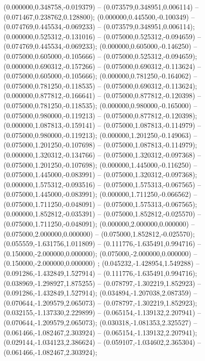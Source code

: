  (0.000000,0.348758,-0.019379) -- (0.073579,0.348951,0.006114) -- (0.071467,0.238762,0.128800);
 (0.000000,0.445500,-0.100349) -- (0.074769,0.445534,-0.069233) -- (0.073579,0.348951,0.006114);
 (0.000000,0.525312,-0.131016) -- (0.075000,0.525312,-0.094659) -- (0.074769,0.445534,-0.069233);
 (0.000000,0.605000,-0.146250) -- (0.075000,0.605000,-0.105666) -- (0.075000,0.525312,-0.094659);
 (0.000000,0.690312,-0.157266) -- (0.075000,0.690312,-0.113624) -- (0.075000,0.605000,-0.105666);
 (0.000000,0.781250,-0.164062) -- (0.075000,0.781250,-0.118535) -- (0.075000,0.690312,-0.113624);
 (0.000000,0.877812,-0.166641) -- (0.075000,0.877812,-0.120398) -- (0.075000,0.781250,-0.118535);
 (0.000000,0.980000,-0.165000) -- (0.075000,0.980000,-0.119213) -- (0.075000,0.877812,-0.120398);
 (0.000000,1.087813,-0.159141) -- (0.075000,1.087813,-0.114979) -- (0.075000,0.980000,-0.119213);
 (0.000000,1.201250,-0.149063) -- (0.075000,1.201250,-0.107698) -- (0.075000,1.087813,-0.114979);
 (0.000000,1.320312,-0.134766) -- (0.075000,1.320312,-0.097368) -- (0.075000,1.201250,-0.107698);
 (0.000000,1.445000,-0.116250) -- (0.075000,1.445000,-0.083991) -- (0.075000,1.320312,-0.097368);
 (0.000000,1.575312,-0.093516) -- (0.075000,1.575313,-0.067565) -- (0.075000,1.445000,-0.083991);
 (0.000000,1.711250,-0.066562) -- (0.075000,1.711250,-0.048091) -- (0.075000,1.575313,-0.067565);
 (0.000000,1.852812,-0.035391) -- (0.075000,1.852812,-0.025570) -- (0.075000,1.711250,-0.048091);
 (0.000000,2.000000,0.000000) -- (0.075000,2.000000,0.000000) -- (0.075000,1.852812,-0.025570);
 (0.055559,-1.631756,1.011809) -- (0.111776,-1.635491,0.994716) -- (0.150000,-2.000000,0.000000);
 (0.075000,-2.000000,0.000000) -- (0.150000,-2.000000,0.000000) ;
 (0.045232,-1.428954,1.549288) -- (0.091286,-1.432849,1.527914) -- (0.111776,-1.635491,0.994716);
 (0.038969,-1.298927,1.875255) -- (0.078797,-1.302219,1.852923) -- (0.091286,-1.432849,1.527914);
 (0.034894,-1.207038,2.087359) -- (0.070644,-1.209579,2.065073) -- (0.078797,-1.302219,1.852923);
 (0.032155,-1.137330,2.229899) -- (0.065154,-1.139132,2.207941) -- (0.070644,-1.209579,2.065073);
 (0.030318,-1.081353,2.325527) -- (0.061466,-1.082467,2.303924) -- (0.065154,-1.139132,2.207941);
 (0.029144,-1.034123,2.386624) -- (0.059107,-1.034602,2.365304) -- (0.061466,-1.082467,2.303924);
